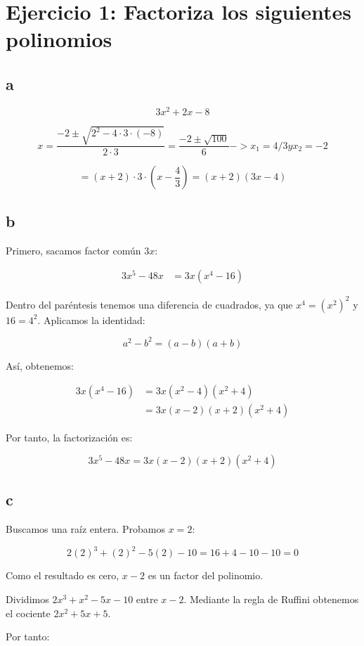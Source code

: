 \documentclass[a4paper,12pt]{article}
\begin{document}
\section*{Ejercicio 1: Factoriza los siguientes polinomios}

\subsection*{a}

     \[
    3x^2+2x-8
    \]

    \[
    x = \dfrac{-2 \pm \sqrt{2^2 - 4 \cdot 3 \cdot (-8)}}{2 \cdot 3} = \dfrac{-2 \pm \sqrt{100}}{6} -> x_1 = 4/3 y x_2 = -2 
    \]

    \[
    = (x+2) \cdot 3 \cdot (x-\dfrac{4}{3})=(x+2)(3x-4)
    \]


\subsection*{b}
Primero, sacamos factor común $3x$:

\begin{align*}
3x^5-48x
&=3x(x^4-16)
\end{align*}

Dentro del paréntesis tenemos una diferencia de cuadrados,
ya que $x^4=(x^2)^2$ y $16=4^2$.
Aplicamos la identidad:

\[
a^2-b^2=(a-b)(a+b)
\]

Así, obtenemos:

\begin{align*}
3x(x^4-16)
&=3x(x^2-4)(x^2+4)\\
&=3x(x-2)(x+2)(x^2+4)
\end{align*}

Por tanto, la factorización es:

\[
\boxed{
3x^5-48x=3x(x-2)(x+2)(x^2+4)
}
\]

\subsection*{c}

Buscamos una raíz entera. Probamos $x=2$:

\[
2(2)^3+(2)^2-5(2)-10=16+4-10-10=0
\]

Como el resultado es cero, $x-2$ es un factor del polinomio.

Dividimos $2x^3+x^2-5x-10$ entre $x-2$.
Mediante la regla de Ruffini obtenemos el cociente
$2x^2+5x+5$.

Por tanto:
\end{document}
